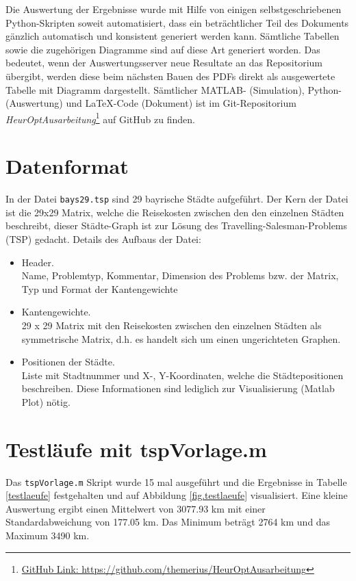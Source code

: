 Die Auswertung der Ergebnisse wurde mit Hilfe von einigen selbstgeschriebenen
Python-Skripten soweit automatisiert, dass ein beträchtlicher Teil des
Dokuments gänzlich automatisch und konsistent generiert werden kann.
Sämtliche Tabellen sowie die zugehörigen Diagramme sind auf diese Art
generiert worden.
Das bedeutet, wenn der Auswertungsserver neue Resultate an das
Repositorium übergibt, werden diese beim nächsten Bauen des PDFs
direkt als ausgewertete Tabelle mit Diagramm dargestellt.
Sämtlicher MATLAB- (Simulation), Python- (Auswertung) und LaTeX-Code (Dokument)
ist im Git-Repositorium \emph{HeurOptAusarbeitung}\footnote{
\url{GitHub Link: https://github.com/themerius/HeurOptAusarbeitung}} auf GitHub
zu finden. 


\section{Datenformat}

\noindent In der Datei {\tt bays29.tsp} sind 29 bayrische Städte aufgeführt.
Der Kern der Datei ist die 29x29 Matrix, welche die Reisekosten zwischen
den den einzelnen Städten beschreibt, dieser Städte-Graph ist zur Lösung
des Travelling-Salesman-Problems (TSP) gedacht.
Details des Aufbaus der Datei:

\begin{itemize}
  \item Header.\\
  Name, Problemtyp, Kommentar, Dimension des Problems bzw. der Matrix, Typ und Format der Kantengewichte
  \item Kantengewichte.\\
  29 x 29 Matrix mit den Reisekosten zwischen den einzelnen Städten als symmetrische Matrix, d.h. es handelt sich um einen ungerichteten Graphen.
  \item Positionen der Städte.\\
  Liste mit Stadtnummer und X-, Y-Koordinaten, welche die Städtepositionen beschreiben.
  Diese Informationen sind lediglich zur Visualisierung (Matlab Plot) nötig.
\end{itemize}


\section{Testläufe mit tspVorlage.m}

Das {\tt tspVorlage.m} Skript wurde 15 mal ausgeführt und die Ergebnisse in
Tabelle \ref{testlaeufe} festgehalten und auf Abbildung \ref{fig.testlaeufe}
visualisiert.
Eine kleine Auswertung ergibt einen Mittelwert von 3077.93 km mit
einer Standardabweichung von 177.05 km.
Das Minimum beträgt 2764 km und das Maximum 3490 km.

